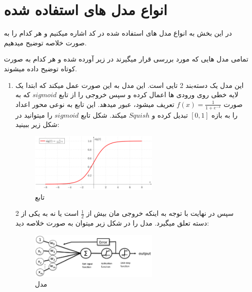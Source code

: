 \section{انواع مدل های استفاده شده}

در این بخش  به انواع مدل های استفاده شده در کد اشاره میکنیم و هر کدام را به صورت خلاصه توضیح میدهیم. 

تمامی مدل هایی که مورد بررسی قرار میگیرند در زیر آورده شده و هر کدام به صورت کوتاه توضیح داده میشوند. 

\begin{enumerate}
	\item 
	
	این مدل یک دسته‌بند 2 تایی است. این مدل به این صورت عمل میکند که ابتدا یک لایه خطی روی ورودی ها اعمال کرده و سپس خروجی را از تابع $sigmoid$ که به صورت 
	$f(x) = \frac{1}{1 + e^{-x}}$
	تعریف میشود، عبور میدهد. این تابع به نوعی محور اعداد را به بازه 
	$[0, 1]$
	تبدیل کرده و $Squish$ میکند. شکل تابع $sigmoid$ را میتوانید در شکل زیر ببینید:
	
	\begin{figure}[h]
		\centering
		\includegraphics[width=0.6\textwidth]{training/2}
		\caption{تابع }
		\label{fig:training:sigmoid}
	\end{figure} 
	
	
	سپس در نهایت با توجه به اینکه خروجی‌ مان بیش از $\frac{1}{2}$ است یا نه به یکی از 2 دسته تعلق میگیرد. مدل را در شکل زیر میتوان به صورت خلاصه دید:
	
	\begin{figure}[h]
		\centering
		\includegraphics[width=0.6\textwidth]{training/1}
		\caption{مدل }
		\label{fig:training:logisitic-regression}
	\end{figure} \pagebreak
	

\end{enumerate}
